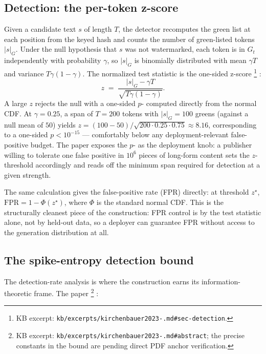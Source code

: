 \subsection{Detection: the per-token z-score}
\label{sec:watermarking-detection}

Given a candidate text $s$ of length $T$, the detector recomputes the
green list at each position from the keyed hash and counts the number
of green-listed tokens $|s|_G$. Under the null hypothesis that $s$ was
not watermarked, each token is in $G_t$ independently with probability
$\gamma$, so $|s|_G$ is binomially distributed with mean $\gamma T$ and
variance $T \gamma (1 - \gamma)$. The normalized test statistic is the
one-sided z-score%
\footnote{KB excerpt: \texttt{kb/excerpts/kirchenbauer2023-.md\#sec-detection}.}
\citep[\S{}sec-detection]{kirchenbauer2023-watermark}:
\[
z \;=\; \frac{|s|_G - \gamma T}{\sqrt{T \gamma (1 - \gamma)}}.
\]
A large $z$ rejects the null with a one-sided $p$- computed
directly from the normal CDF. At $\gamma = 0.25$, a span of $T = 200$
tokens with $|s|_G = 100$ greens (against a null mean of $50$) yields
$z = (100 - 50)/\sqrt{200 \cdot 0.25 \cdot 0.75} \approx 8.16$,
corresponding to a one-sided $p < 10^{-15}$ --- comfortably below any
deployment-relevant false-positive budget. The paper exposes the
$p$- as the deployment knob: a publisher willing to tolerate one
false positive in $10^6$ pieces of long-form content sets the
$z$-threshold accordingly and reads off the minimum span required for
detection at a given  strength.

The same calculation gives the false-positive rate (FPR) directly: at
threshold $z^\star$, $\mathrm{FPR} = 1 - \Phi(z^\star)$, where $\Phi$
is the standard normal CDF. This is the structurally cleanest piece of
the construction: FPR control is by the test statistic alone, not by
held-out data, so a deployer can guarantee FPR without access to the
generation distribution at all.

\subsection{The spike-entropy detection bound}
\label{sec:watermarking-spike-entropy}

The detection-rate analysis is where the construction earns its
information-theoretic frame. The paper%
\footnote{KB excerpt: \texttt{kb/excerpts/kirchenbauer2023-.md\#abstract};
the precise constants in the bound are pending direct PDF anchor
verification.}
\citep[\S{}abstract]{kirchenbauer2023-watermark}:


